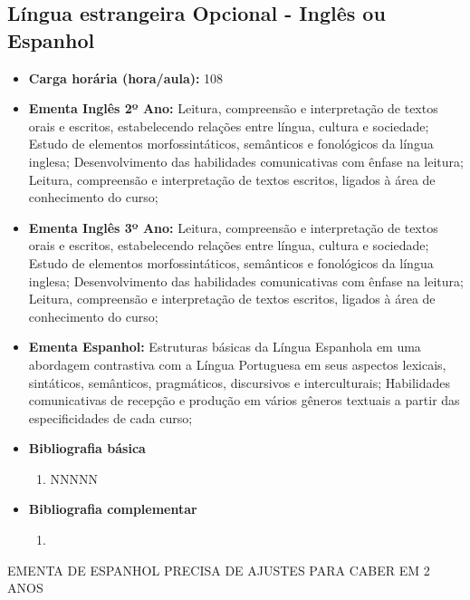 \documentclass[11pt,fleqn]{book} %
\newcommand{\VER}[1]{\begingroup\color{red}#1\endgroup}
\begin{document}
\subsection{Língua estrangeira Opcional - Inglês ou Espanhol}\label{disc:ingles_espanhol}
\begin{itemize}
	\item \textbf{Carga horária (hora/aula):} 108
	\item \textbf{Ementa Inglês 2º Ano:} 
		Leitura, compreensão e interpretação de textos orais e escritos, estabelecendo relações entre língua, cultura e sociedade;
		Estudo de elementos morfossintáticos, semânticos e fonológicos da língua inglesa;
		Desenvolvimento das habilidades comunicativas com ênfase na leitura;
		Leitura, compreensão e interpretação de textos escritos, ligados à área de conhecimento do curso;
	\item \textbf{Ementa Inglês 3º Ano:} 
		Leitura, compreensão e interpretação de textos orais e escritos, estabelecendo relações entre língua, cultura e sociedade;
		Estudo de elementos morfossintáticos, semânticos e fonológicos da língua inglesa;
		Desenvolvimento das habilidades comunicativas com ênfase na leitura;
		Leitura, compreensão e interpretação de textos escritos, ligados à área de conhecimento do curso;
	\item \textbf{Ementa Espanhol:} 
		Estruturas básicas da Língua Espanhola em uma abordagem contrastiva com a Língua Portuguesa em seus aspectos lexicais, sintáticos, semânticos, pragmáticos, discursivos e interculturais; 
		Habilidades comunicativas de recepção e produção em vários gêneros textuais a partir das especificidades de cada curso;	
	\item \textbf{Bibliografia básica}
	\begin{enumerate}
		\item NNNNN
	\end{enumerate}
	\item \textbf{Bibliografia complementar}
	\begin{enumerate}
		\item 
	\end{enumerate}	
\end{itemize}
\VER{EMENTA DE ESPANHOL PRECISA DE AJUSTES PARA CABER EM 2 ANOS}

\newpage
\end{document}
